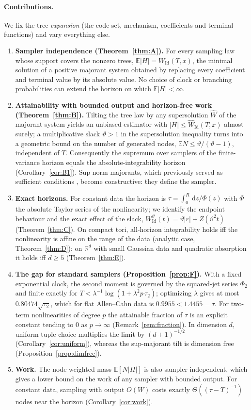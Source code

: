 \documentclass[11pt]{article}
\theoremstyle{definition}
\theoremstyle{remark}
\newcommand{\R}{\mathbb{R}}
\newcommand{\E}{\mathbb{E}}
\newcommand{\Id}{\mathrm{Id}}
\newcommand{\dd}{\,\mathrm{d}}
\newcommand{\Wh}{\widehat W}
\begin{document}
\paragraph{Contributions.} We fix the tree \emph{expansion} (the code set,
mechanism, coefficients and terminal functions) and vary everything else.
\begin{enumerate}[leftmargin=*]
\item \textbf{Sampler independence (Theorem~\ref{thm:A}).} For every
sampling law whose support covers the nonzero trees, $\E|H|=W_\Id(T,x)$,
the minimal solution of a positive majorant system obtained by replacing
every coefficient and terminal value by its absolute value. No choice of
clock or branching probabilities can extend the horizon on which $\E|H|<\infty$.
\item \textbf{Attainability with bounded output and horizon-free work
(Theorem~\ref{thm:B}).} Tilting the tree law by any supersolution
$\Wh$ of the majorant system yields an unbiased estimator with
$|H|\le\Wh_\Id(T,x)$ almost surely; a multiplicative slack $\vartheta>1$
in the supersolution inequality turns into a geometric bound on the number
of generated nodes, $\E N\le\vartheta/(\vartheta-1)$, independent of $T$.
Consequently the supremum over samplers of the finite-variance horizon
equals the absolute-integrability horizon (Corollary~\ref{cor:B1}).
Sup-norm majorants, which previously served as sufficient conditions
\cite{HLT21}, become constructive: they define the sampler.
\item \textbf{Exact horizons.} For constant data the horizon is
$\tau=\int_0^R\dd z/\Phi(z)$ with $\Phi$ the absolute Taylor series of
the nonlinearity; we identify the endpoint behaviour and the exact effect
of the slack, $W^\vartheta_\Id(t)=\vartheta|r|+Z(\vartheta^2t)$
(Theorem~\ref{thm:C}). On compact tori, all-horizon integrability holds
iff the nonlinearity is affine on the range of the data (analytic case,
Theorem~\ref{thm:D}); on $\R^d$ with small Gaussian data and quadratic
absorption it holds iff $d\ge5$ (Theorem~\ref{thm:E}).
\item \textbf{The gap for standard samplers (Proposition~\ref{prop:F}).}
With a fixed exponential clock, the second moment is governed by the
squared-jet series $\Phi_2$ and finite exactly for
$T<\lambda^{-1}\log(1+\lambda^2 p\,\tau_2)$; optimizing $\lambda$ gives
at most $0.80474\sqrt{\tau_2}$, which for flat Allen--Cahn data is
$0.9955<1.4455=\tau$. For two-term nonlinearities of degree $p$ the
attainable fraction of $\tau$ is an explicit constant tending to $0$ as
$p\to\infty$ (Remark~\ref{rem:fraction}). In dimension $d$, uniform tuple
choice multiplies the limit by $(d+1)^{-1/2}$ (Corollary~\ref{cor:uniform}),
whereas the sup-majorant tilt is dimension free
(Proposition~\ref{prop:dimfree}).
\item \textbf{Work.} The node-weighted mass $\E[N|H|]$ is also sampler
independent, which gives a lower bound on the work of any sampler with
bounded output. For constant data, sampling with output
$O(W)$ costs exactly $\Theta((\tau-T)^{-1})$ nodes near the horizon
(Corollary~\ref{cor:work}).
\end{enumerate}
\end{document}
